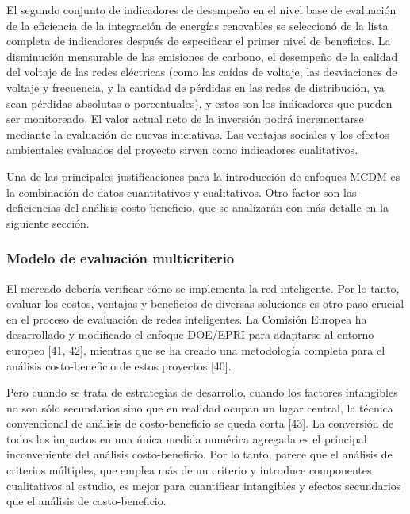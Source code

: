 \documentclass[
]{article}
\begin{document}
El segundo conjunto de indicadores de desempeño en el nivel base de
evaluación de la eficiencia de la integración de energías renovables se
seleccionó de la lista completa de indicadores después de especificar el
primer nivel de beneficios. La disminución mensurable de las emisiones
de carbono, el desempeño de la calidad del voltaje de las redes
eléctricas (como las caídas de voltaje, las desviaciones de voltaje y
frecuencia, y la cantidad de pérdidas en las redes de distribución, ya
sean pérdidas absolutas o porcentuales), y estos son los indicadores que
pueden ser monitoreado. El valor actual neto de la inversión podrá
incrementarse mediante la evaluación de nuevas iniciativas. Las ventajas
sociales y los efectos ambientales evaluados del proyecto sirven como
indicadores cualitativos.

Una de las principales justificaciones para la introducción de enfoques
MCDM es la combinación de datos cuantitativos y cualitativos. Otro
factor son las deficiencias del análisis costo-beneficio, que se
analizarán con más detalle en la siguiente sección.

\hypertarget{modelo-de-evaluaciuxf3n-multicriterio}{%
\subsubsection{Modelo de evaluación
multicriterio}\label{modelo-de-evaluaciuxf3n-multicriterio}}

El mercado debería verificar cómo se implementa la red inteligente. Por
lo tanto, evaluar los costos, ventajas y beneficios de diversas
soluciones es otro paso crucial en el proceso de evaluación de redes
inteligentes. La Comisión Europea ha desarrollado y modificado el
enfoque DOE/EPRI para adaptarse al entorno europeo {[}41, 42{]},
mientras que se ha creado una metodología completa para el análisis
costo-beneficio de estos proyectos {[}40{]}.

Pero cuando se trata de estrategias de desarrollo, cuando los factores
intangibles no son sólo secundarios sino que en realidad ocupan un lugar
central, la técnica convencional de análisis de costo-beneficio se queda
corta {[}43{]}. La conversión de todos los impactos en una única medida
numérica agregada es el principal inconveniente del análisis
costo-beneficio. Por lo tanto, parece que el análisis de criterios
múltiples, que emplea más de un criterio y introduce componentes
cualitativos al estudio, es mejor para cuantificar intangibles y efectos
secundarios que el análisis de costo-beneficio.
\end{document}
